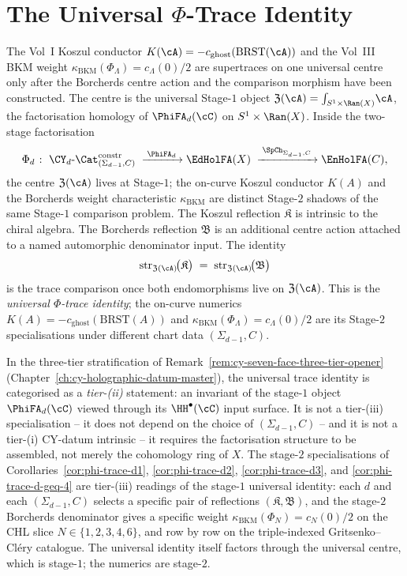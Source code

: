 \chapter{The Universal \texorpdfstring{$\Phi$}{Phi}-Trace Identity}
\label{ch:phi-universal-trace-platonic}

The Vol~I Koszul conductor $K(\cA) = -c_{\mathrm{ghost}}(\mathrm{BRST}(\cA))$
and the Vol~III BKM weight
$\kappa_{\mathrm{BKM}}(\Phi_\Lambda) = c_\Lambda(0)/2$ are
supertraces on one universal centre only after the Borcherds centre
action and the comparison morphism have been constructed. The centre is
the universal Stage-$1$ object
$\mathfrak{Z}(\cA) = \int_{S^1 \times \Ran(X)}\!\cA$, the
factorisation homology of $\PhiFA_d(\cC)$ on $S^1 \times \Ran(X)$. Inside
the two-stage factorisation
\[
 \Phi_d \;\colon\; \CY_d\text{-}\Cat^{\mathrm{constr}}_{(\Sigma_{d-1},C)}
 \;\xrightarrow{\;\PhiFA_d\;}
 \EdHolFA(X)
 \;\xrightarrow{\;\SpCh_{\Sigma_{d-1}, C}\;}
 \EnHolFA(C),
\]
the centre $\mathfrak{Z}(\cA)$ lives at Stage-$1$; the on-curve
Koszul conductor $K(A)$ and the Borcherds weight characteristic
$\kappa_{\mathrm{BKM}}$ are distinct Stage-$2$ shadows of
the same Stage-$1$ comparison problem.  The Koszul reflection
\(\mathfrak K\) is intrinsic to the chiral algebra.  The Borcherds
reflection \(\mathfrak B\) is an additional centre action attached to a
named automorphic denominator input.  The identity
\[
 \mathrm{str}_{\mathfrak{Z}(\cA)}\!\bigl(\mathfrak K\bigr)
 \;=\;
 \mathrm{str}_{\mathfrak{Z}(\cA)}\!\bigl(\mathfrak B\bigr)
\]
is the trace comparison once both endomorphisms live on
\(\mathfrak Z(\cA)\).  This is the
\emph{universal $\Phi$-trace identity}; the on-curve numerics
$K(A) = -c_{\mathrm{ghost}}(\mathrm{BRST}(A))$ and
$\kappa_{\mathrm{BKM}}(\Phi_\Lambda) = c_\Lambda(0)/2$ are its Stage-$2$ specialisations
under different chart data $(\Sigma_{d-1}, C)$.

\begin{remark}
\label{rem:phi-trace-tier-ii}
In the three-tier stratification of
Remark~\ref{rem:cy-seven-face-three-tier-opener} (Chapter~\ref{ch:cy-holographic-datum-master}),
the universal trace identity is categorised as a \emph{tier-(ii)}
statement: an invariant of the stage-$1$ object $\PhiFA_d(\cC)$ viewed
through its $\HH^\bullet(\cC)$ input surface. It is not a tier-(iii)
specialisation -- it does not depend on the choice of $(\Sigma_{d-1}, C)$
-- and it is not a tier-(i) CY-datum intrinsic -- it requires the
factorisation structure to be assembled, not merely the cohomology ring
of $X$. The stage-$2$ specialisations of
Corollaries~\ref{cor:phi-trace-d1}, \ref{cor:phi-trace-d2},
\ref{cor:phi-trace-d3}, and \ref{cor:phi-trace-d-geq-4} are tier-(iii)
readings of the stage-$1$ universal identity: each $d$ and each
$(\Sigma_{d-1}, C)$ selects a specific pair of reflections
$(\mathfrak{K}, \mathfrak{B})$, and the stage-$2$ Borcherds denominator
gives a specific weight $\kappa_{\mathrm{BKM}}(\Phi_N) = c_N(0)/2$ on
the CHL slice $N \in \{1, 2, 3, 4, 6\}$, and row by row on the
triple-indexed Gritsenko--Cléry catalogue. The universal identity itself
factors through the universal centre, which is stage-$1$; the numerics
are stage-$2$.
\end{remark}

